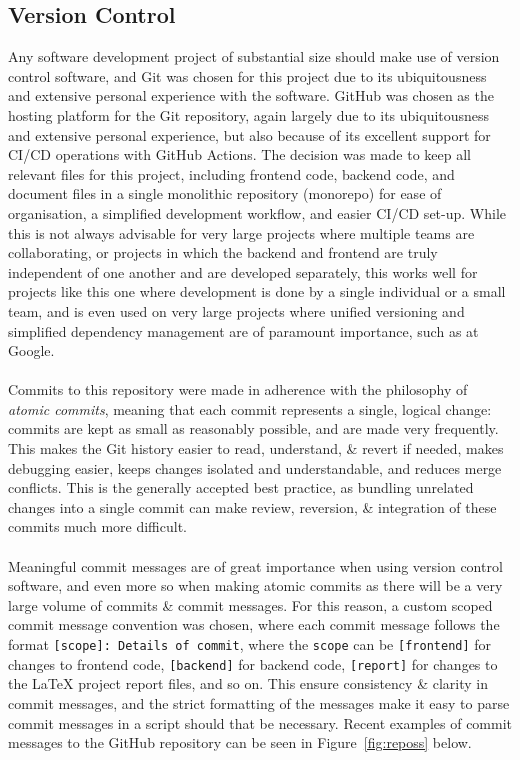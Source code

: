 \documentclass[a4paper,11pt]{report}
\begin{document}
\subsection{Version Control}
Any software development project of substantial size should make use of version control software, and Git\supercite{git} was chosen for this project due to its ubiquitousness and extensive personal experience with the software.
GitHub\supercite{github} was chosen as the hosting platform for the Git repository, again largely due to its ubiquitousness and extensive personal experience, but also because of its excellent support for CI/CD operations with GitHub Actions\supercite{githubactions}.
The decision was made to keep all relevant files for this project, including frontend code, backend code, and document files in a single monolithic repository (monorepo) for ease of organisation, a simplified development workflow, and easier CI/CD set-up.
While this is not always advisable for very large projects where multiple teams are collaborating, or projects in which the backend and frontend are truly independent of one another and are developed separately, this works well for projects like this one where development is done by a single individual or a small team\supercite{brito2018monorepos}, and is even used on very large projects where unified versioning and simplified dependency management are of paramount importance, such as at Google\supercite{potvin2016google}.
\\\\
Commits to this repository were made in adherence with the philosophy of \textit{atomic commits}, meaning that each commit represents a single, logical change:
commits are kept as small as reasonably possible, and are made very frequently.
This makes the Git history easier to read, understand, \& revert if needed, makes debugging easier, keeps changes isolated and understandable, and reduces merge conflicts.
This is the generally accepted best practice, as bundling unrelated changes into a single commit can make review, reversion, \& integration of these commits much more difficult\supercite{dias2015untangling}.
\\\\
Meaningful commit messages are of great importance when using version control software, and even more so when making atomic commits as there will be a very large volume of commits \& commit messages.
For this reason, a custom scoped commit message convention was chosen, where each commit message follows the format \verb|[scope]: Details of commit|, where the \verb|scope| can be \verb|[frontend]| for changes to frontend code, \verb|[backend]| for backend code, \verb|[report]| for changes to the {\LaTeX} project report files, and so on.
This ensure consistency \& clarity in commit messages, and the strict formatting of the messages make it easy to parse commit messages in a script should that be necessary.
Recent examples of commit messages to the GitHub repository can be seen in Figure~\ref{fig:reposs} below.
\end{document}
